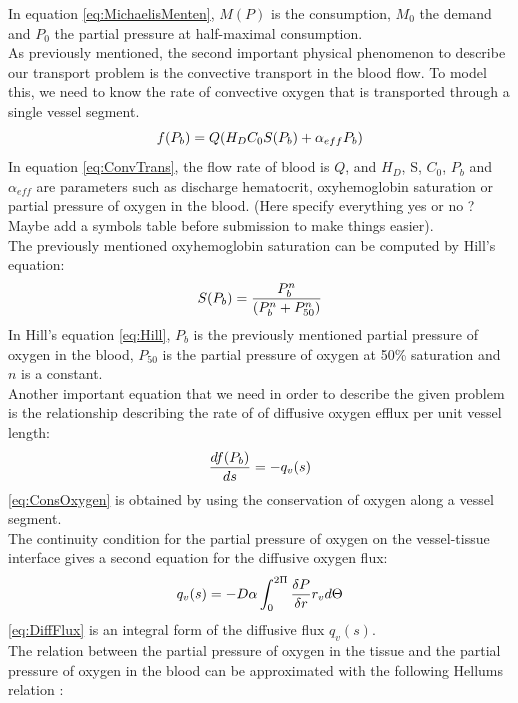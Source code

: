 %
In equation \ref{eq:MichaelisMenten}, $M(P)$ is the consumption, $M_0$ the demand and $P_0$ the partial pressure at half-maximal consumption.
\\As previously mentioned, the second important physical phenomenon to describe our transport problem is the convective transport in the blood flow. To model this, we need to know the rate of convective oxygen that is transported through a single vessel segment.
\begin{equation}
\\f(P_b) = Q(H_DC_0S(P_b) + \alpha_{eff}P_b)
\label{eq:ConvTrans}
\end{equation}
%
In equation \ref{eq:ConvTrans}, the flow rate of blood is $Q$, and $H_D$, S, $C_0$, $P_b$ and $\alpha_{eff}$ are parameters such as discharge hematocrit, oxyhemoglobin saturation or partial pressure of oxygen in the blood. {\color{red}(Here specify everything yes or no ? Maybe add a symbols table before submission to make things easier)}.
\\The previously mentioned oxyhemoglobin saturation can be computed by Hill's equation:
\begin{equation}
\\S(P_b) = \frac{P_b^n}{(P_b^n+P_{50}^n)}
\label{eq:Hill}
\end{equation}
In Hill's equation \ref{eq:Hill}, $P_b$ is the previously mentioned partial pressure of oxygen in the blood, $P_{50}$ is the partial pressure of oxygen at 50\% saturation and $n$ is a constant.
%
\\Another important equation that we need in order to describe the given problem is the relationship describing the rate of of diffusive oxygen efflux per unit vessel length:
\begin{equation}
\\ \frac{df(P_b)}{ds} = -q_v(s)
\label{eq:ConsOxygen}
\end{equation}
\ref{eq:ConsOxygen} is obtained by using the conservation of oxygen along a vessel segment.
%
\\The continuity condition for the partial pressure of oxygen on the vessel-tissue interface gives a second equation for the diffusive oxygen flux:
\begin{equation}
\\q_v(s) = -D\alpha \int_{0}^{2\Pi} 
\frac{\delta P}{\delta r}r_v d \Theta
\label{eq:DiffFlux}
\end{equation}
\ref{eq:DiffFlux} is an integral form of the diffusive flux $q_v(s)$.
%
\\The relation between the partial pressure of oxygen in the tissue and the partial pressure of oxygen in the blood can be approximated with the following  Hellums relation \cite{hellums1977resistance}:
